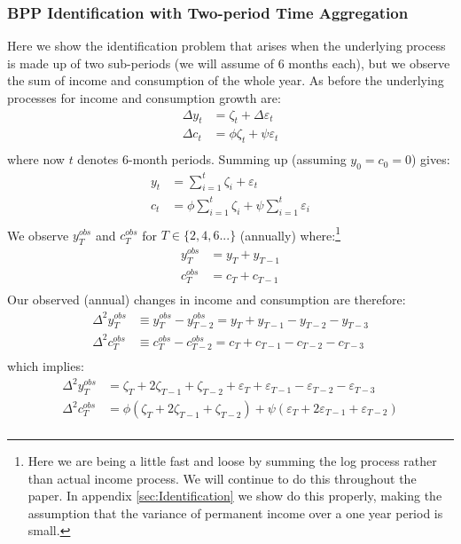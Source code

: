 \documentclass[titlepage]{\econtex}\newcommand{\texname}{IncomeUncertainty}
\begin{document}
\subsubsection{BPP Identification with Two-period Time Aggregation} \label{BPP_two_period}
Here we show the identification problem that arises when the underlying process is made up of two sub-periods (we will assume of 6 months each), but we observe the sum of income and consumption of the whole year. As before the underlying processes for income and consumption growth are:
\begin{align*}
\Delta y_t & = \zeta_t + \Delta \varepsilon_t \\
\Delta c_t & = \phi \zeta_t + \psi \varepsilon_t  \\
\end{align*}
where now $t$ denotes 6-month periods. Summing up (assuming $y_0=c_0=0$) gives:
\begin{align*}
y_t & = \sum_{i=1}^t \zeta_i + \varepsilon_t  \\
c_t & = \phi \sum_{i=1}^t \zeta_i + \psi \sum_{i=1}^t \varepsilon_i  \\
\end{align*}
We observe $y^{obs}_T$ and $c^{obs}_T$ for $T \in \{2,4,6...\}$ (annually) where:\footnote{Here we are being a little fast and loose by summing the log process rather than actual income process. We will continue to do this throughout the paper. In appendix \ref{sec:Identification} we show do this properly, making the assumption that the variance of permanent income over a one year period is small.}
\begin{align*}
y^{obs}_T & = y_T + y_{T-1}  \\
c^{obs}_T & = c_T + c_{T-1}  \\
\end{align*}
Our observed (annual) changes in income and consumption are therefore:
\begin{align*}
\Delta^2 y^{obs}_T & \equiv y^{obs}_T-y^{obs}_{T-2} =  y_T + y_{T-1} - y_{T-2} - y_{T-3} \\
\Delta^2 c^{obs}_T & \equiv c^{obs}_T-c^{obs}_{T-2} =  c_T + c_{T-1} - c_{T-2} - c_{T-3}  \\
\end{align*}
which implies:
\begin{align*}
\Delta^2 y^{obs}_T & = \zeta_T + 2\zeta_{T-1} +\zeta_{T-2} + \varepsilon_T + \varepsilon_{T-1} - \varepsilon_{T-2} - \varepsilon_{T-3} \\
\Delta^2 c^{obs}_T & =  \phi(\zeta_T + 2\zeta_{T-1} +\zeta_{T-2}) + \psi(\varepsilon_T + 2\varepsilon_{T-1} + \varepsilon_{T-2} ) \\
\end{align*}
\end{document}
